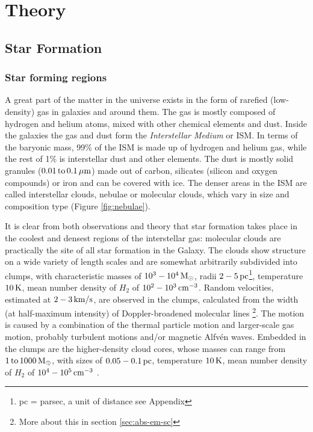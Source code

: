 \chapter{Theory}

\section{Star Formation}
\label{star-formation}
\subsection{Star forming regions}


	A great part of the matter in the universe exists in the form of rarefied (low-density) gas in galaxies and around them. The gas is mostly composed of hydrogen and helium atoms, mixed with other chemical elements and dust. Inside the galaxies the gas and dust form the \emph{Interstellar Medium} or ISM. In terms of the baryonic mass, 99\% of the ISM is made up of hydrogen and helium gas, while the rest of 1\% is interstellar dust and other elements. The dust is mostly solid granules ($0.01\, \rm{to}\, 0.1\, \rm{\mu m}$) made out of carbon, silicates (silicon and oxygen compounds) or iron and can be covered with ice. The denser areas in the ISM are called interstellar clouds, nebulae or molecular clouds, which vary in size and composition type (Figure \ref{fig:nebulae}).

It is clear from both observations and theory that star formation takes place in the coolest and densest regions of the interstellar gas: molecular clouds are practically the site of all star formation in the Galaxy. The clouds show structure on a wide variety of length scales and are somewhat arbitrarily subdivided into clumps, with characteristic masses of $10^3 - 10^4 \,\rm{M_{\odot}}$, radii $2-5\,\rm{pc}$\footnote{pc = parsec, a unit of distance see Appendix}, temperature $10\, \rm{K}$, mean number density of $H_2$ of $\rm{10^2 - 10^3 \,cm^{-3}}$. Random velocities, estimated at $\rm{2-3 \,km/s}$, are observed in the clumps, calculated from the width (at half-maximum intensity) of Doppler-broadened molecular lines \footnote{More about this in section \ref{sec:abs-em-sc}}. The motion is caused by a combination of the thermal particle motion and larger-scale gas motion, probably turbulent motions and/or magnetic Alfvén waves. Embedded in the clumps are the higher-density cloud cores, whose masses can range from $\rm{1 \, to \, 1000 \, M_{\odot}}$, with sizes of $\rm{0.05 - 0.1 \,pc}$, temperature $\rm{10 \, K}$, mean number density of $H_2$ of $\rm{10^4 - 10^5 \, cm^{-3}}$ \citep{Bodenheimer2011}.

